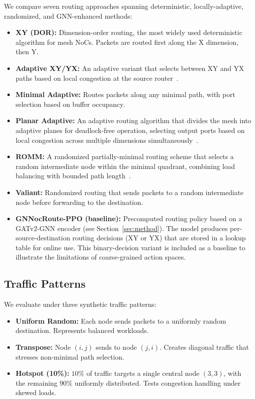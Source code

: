We compare seven routing approaches spanning deterministic, locally-adaptive, randomized, and GNN-enhanced methods:

\begin{itemize}
    \item \textbf{XY (DOR):} Dimension-order routing, the most widely used deterministic algorithm for mesh NoCs. Packets are routed first along the X dimension, then Y.
    \item \textbf{Adaptive XY/YX:} An adaptive variant that selects between XY and YX paths based on local congestion at the source router~\cite{balfour2006}.
    \item \textbf{Minimal Adaptive:} Routes packets along any minimal path, with port selection based on buffer occupancy.
    \item \textbf{Planar Adaptive:} An adaptive routing algorithm that divides the mesh into adaptive planes for deadlock-free operation, selecting output ports based on local congestion across multiple dimensions simultaneously~\cite{chiu2000}.
    \item \textbf{ROMM:} A randomized partially-minimal routing scheme that selects a random intermediate node within the minimal quadrant, combining load balancing with bounded path length~\cite{ni1999romm}.
    \item \textbf{Valiant:} Randomized routing that sends packets to a random intermediate node before forwarding to the destination.
    \item \textbf{GNNocRoute-PPO (baseline):} Precomputed routing policy based on a GATv2-GNN encoder (see Section~\ref{sec:method}). The model produces per-source-destination routing decisions (XY or YX) that are stored in a lookup table for online use. This binary-decision variant is included as a baseline to illustrate the limitations of coarse-grained action spaces.
\end{itemize}

\subsection{Traffic Patterns}

We evaluate under three synthetic traffic patterns:

\begin{itemize}
    \item \textbf{Uniform Random:} Each node sends packets to a uniformly random destination. Represents balanced workloads.
    \item \textbf{Transpose:} Node $(i,j)$ sends to node $(j,i)$. Creates diagonal traffic that stresses non-minimal path selection.
    \item \textbf{Hotspot (10\%):} $10\%$ of traffic targets a single central node $(3,3)$, with the remaining $90\%$ uniformly distributed. Tests congestion handling under skewed loads.
\end{itemize}

